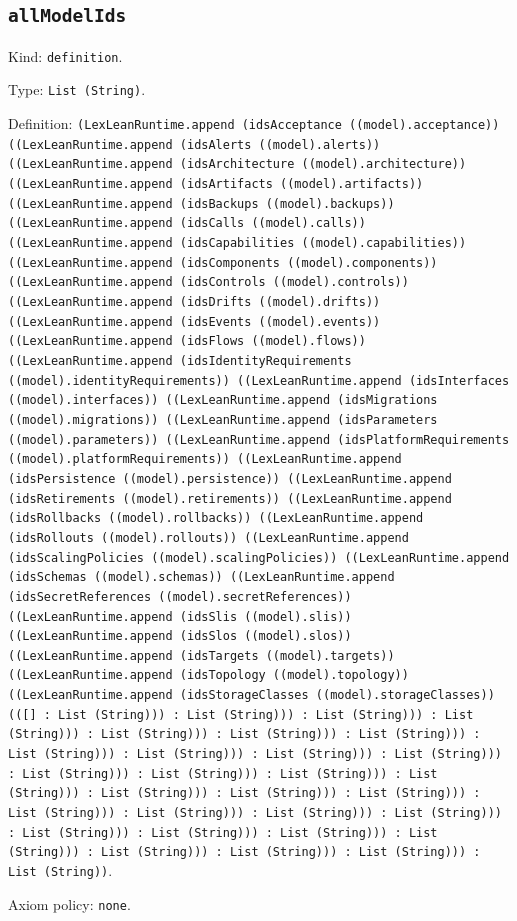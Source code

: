\documentclass[11pt]{article}
\begin{document}
\subsection*{\texttt{allModelIds}}
\noindent Kind: \texttt{definition}.\par
\noindent Type: \texttt{List (String)}.\par
\noindent Definition: \texttt{(LexLeanRuntime.append (idsAcceptance ((model).acceptance)) ((LexLeanRuntime.append (idsAlerts ((model).alerts)) ((LexLeanRuntime.append (idsArchitecture ((model).architecture)) ((LexLeanRuntime.append (idsArtifacts ((model).artifacts)) ((LexLeanRuntime.append (idsBackups ((model).backups)) ((LexLeanRuntime.append (idsCalls ((model).calls)) ((LexLeanRuntime.append (idsCapabilities ((model).capabilities)) ((LexLeanRuntime.append (idsComponents ((model).components)) ((LexLeanRuntime.append (idsControls ((model).controls)) ((LexLeanRuntime.append (idsDrifts ((model).drifts)) ((LexLeanRuntime.append (idsEvents ((model).events)) ((LexLeanRuntime.append (idsFlows ((model).flows)) ((LexLeanRuntime.append (idsIdentityRequirements ((model).identityRequirements)) ((LexLeanRuntime.append (idsInterfaces ((model).interfaces)) ((LexLeanRuntime.append (idsMigrations ((model).migrations)) ((LexLeanRuntime.append (idsParameters ((model).parameters)) ((LexLeanRuntime.append (idsPlatformRequirements ((model).platformRequirements)) ((LexLeanRuntime.append (idsPersistence ((model).persistence)) ((LexLeanRuntime.append (idsRetirements ((model).retirements)) ((LexLeanRuntime.append (idsRollbacks ((model).rollbacks)) ((LexLeanRuntime.append (idsRollouts ((model).rollouts)) ((LexLeanRuntime.append (idsScalingPolicies ((model).scalingPolicies)) ((LexLeanRuntime.append (idsSchemas ((model).schemas)) ((LexLeanRuntime.append (idsSecretReferences ((model).secretReferences)) ((LexLeanRuntime.append (idsSlis ((model).slis)) ((LexLeanRuntime.append (idsSlos ((model).slos)) ((LexLeanRuntime.append (idsTargets ((model).targets)) ((LexLeanRuntime.append (idsTopology ((model).topology)) ((LexLeanRuntime.append (idsStorageClasses ((model).storageClasses)) (([] : List (String))) : List (String))) : List (String))) : List (String))) : List (String))) : List (String))) : List (String))) : List (String))) : List (String))) : List (String))) : List (String))) : List (String))) : List (String))) : List (String))) : List (String))) : List (String))) : List (String))) : List (String))) : List (String))) : List (String))) : List (String))) : List (String))) : List (String))) : List (String))) : List (String))) : List (String))) : List (String))) : List (String))) : List (String))) : List (String))}.\par
\noindent Axiom policy: \texttt{none}.\par
\end{document}

